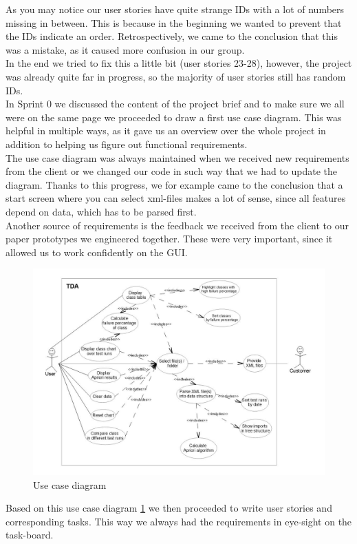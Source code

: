 As you may notice our user stories have quite strange IDs with a lot of numbers missing in between. This is because in the beginning we wanted to prevent that the IDs indicate an order. Retrospectively, we came to the conclusion that this was a mistake, as it caused more confusion in our group.\\
In the end we tried to fix this a little bit (user stories 23-28), however, the project was already quite far in progress, so the majority of user stories still has random IDs.  \\
\newline
In Sprint 0 we discussed the content of the project brief and to make sure we all were on the same page we proceeded to draw a first use case diagram. This was helpful in multiple ways, as it gave us an overview over the whole project in addition to helping us figure out functional requirements.\\
The use case diagram was always maintained when we received new requirements from the client or we changed our code in such way that we had to update the diagram. Thanks to this progress, we for example came to the conclusion that a start screen where you can select xml-files makes a lot of sense, since all features depend on data, which has to be parsed first.\\
Another source of requirements is the feedback we received from the client to our paper prototypes we engineered together. These were very important, since it allowed us to work confidently on the GUI. %

\begin{figure}
	\begin{center}
		\includegraphics[scale=0.6]{pics/UseCaseDiagram.jpg}
		\caption{Use case diagram}
		\label{use-case}
	\end{center}	
\end{figure}
Based on this use case diagram \ref{use-case} we then proceeded to write user stories and corresponding tasks. This way we always had the requirements in eye-sight on the task-board.

